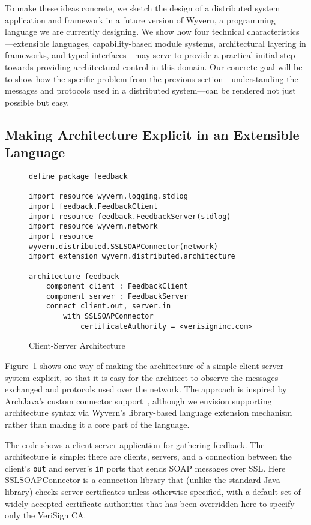 \documentclass[runningheads]{llncs}
\begin{document}
\begin{sloppypar}
To make these ideas concrete, we sketch the design of a distributed system application and framework in a future version of Wyvern, a programming language we are currently designing.  We show how four technical characteristics---extensible languages, capability-based module systems, architectural layering in frameworks, and typed interfaces---may serve to provide a practical initial step towards providing architectural control in this domain.  Our concrete goal will be to show how the specific problem from the previous section---understanding the messages and protocols used in a distributed system---can be rendered not just possible but easy.


\subsection{Making Architecture Explicit in an Extensible Language}

   
\begin{figure}[t]
\begin{lstlisting}
define package feedback

import resource wyvern.logging.stdlog
import feedback.FeedbackClient
import resource feedback.FeedbackServer(stdlog)
import resource wyvern.network
import resource wyvern.distributed.SSLSOAPConnector(network)
import extension wyvern.distributed.architecture

architecture feedback
    component client : FeedbackClient
    component server : FeedbackServer
    connect client.out, server.in
        with SSLSOAPConnector
            certificateAuthority = <verisigninc.com>
\end{lstlisting}
\caption{Client-Server Architecture}
\label{f-architecture}
\end{figure}

Figure~\ref{f-architecture} shows one way of making the architecture of a simple client-server system explicit, so that it is easy for the architect to observe the messages exchanged and protocols used over the network.  The approach is inspired by ArchJava's custom connector support~\cite{ASCN03}, although we envision supporting architecture syntax via Wyvern's library-based language extension mechanism~\cite{TSLs-ECOOP14} rather than making it a core part of the language.

The code shows a client-server application for gathering feedback.  The architecture is simple: there are clients, servers, and a connection between the client's \texttt{out} and server's \texttt{in} ports that sends SOAP messages over SSL.  Here SSLSOAPConnector is a connection library that (unlike the standard Java library) checks server certificates unless otherwise specified, with a default set of widely-accepted certificate authorities that has been overridden here to specify only the VeriSign CA.



\end{sloppypar}
\end{document}
